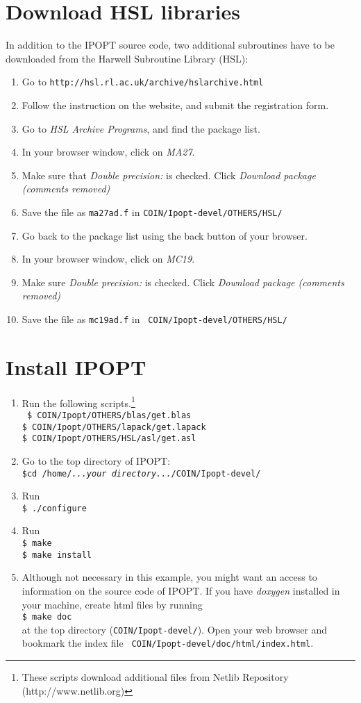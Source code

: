 \documentclass[letter,12pt]{article}
\begin{document}
\section{Download HSL libraries}
In addition to the IPOPT source code, two additional subroutines
have to be downloaded from the Harwell Subroutine Library (HSL):
\begin{enumerate}
\item{Go to {\tt http://hsl.rl.ac.uk/archive/hslarchive.html}}
\item{Follow the instruction on the website, and submit the registration form.}
\item{Go to \textit{HSL Archive Programs}, and find the package list.}
\item{In your browser window, click on \textit{MA27}.}
\item{Make sure that \textit{Double precision:} is checked. Click \textit{Download package (comments removed)}}
\item{Save the file as {\tt ma27ad.f} in {\tt COIN/Ipopt-devel/OTHERS/HSL/}}
\item{Go back to the package list using the back button of your browser.}
\item{In your browser window, click on \textit{MC19}.}
\item{Make sure \textit{Double precision:} is checked. Click \textit{Download package (comments removed)}}
\item{Save the file as {\tt mc19ad.f} in {\tt
COIN/Ipopt-devel/OTHERS/HSL/}}
\end{enumerate}

\section{Install IPOPT}
\begin{enumerate}
\item{Run the following scripts.\footnote{These scripts download additional
     files from Netlib Repository (http://www.netlib.org)}\\
{\tt
\$ COIN/Ipopt/OTHERS/blas/get.blas\\
\$ COIN/Ipopt/OTHERS/lapack/get.lapack\\
\$ COIN/Ipopt/OTHERS/HSL/asl/get.asl}}
\item{Go to the top directory of IPOPT:\\
{\tt\$cd /home/\textit{...your directory...}/COIN/Ipopt-devel/}}
\item{Run\\
{\tt\$ ./configure}}
\item{Run\\
{\tt \$ make}\\
{\tt \$ make install}}
\item{Although not necessary in this example, you might want an access
to information on the source code of IPOPT. If you have \textit{doxygen}
installed in your machine, create html files by running\\
{\tt \$ make doc}\\
at the top directory ({\tt COIN/Ipopt-devel/}).
Open your web browser and bookmark the index file {\tt
     COIN/Ipopt-devel/doc/html/index.html}.}
\end{enumerate}
\end{document}
